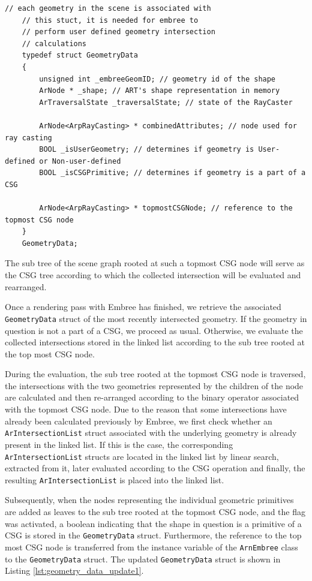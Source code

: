 \begin{listing} 
	\begin{lstlisting}[caption={Updated \texttt{GeometryData} struct for CSG rendering.}, label={lst:geometry_data_update1}]
	// each geometry in the scene is associated with
	// this stuct, it is needed for embree to
	// perform user defined geometry intersection
	// calculations
	typedef struct GeometryData 
	{
		unsigned int _embreeGeomID; // geometry id of the shape
		ArNode * _shape; // ART's shape representation in memory
		ArTraversalState _traversalState; // state of the RayCaster
		
		ArNode<ArpRayCasting> * combinedAttributes; // node used for ray casting
		BOOL _isUserGeometry; // determines if geometry is User-defined or Non-user-defined
		BOOL _isCSGPrimitive; // determines if geometry is a part of a CSG
		
		ArNode<ArpRayCasting> * topmostCSGNode; // reference to the topmost CSG node 
	}
	GeometryData;
	\end{lstlisting}
\end{listing}

The sub tree of the scene graph rooted at such a topmost CSG node will serve as the CSG tree according to which the collected intersection will be evaluated and rearranged.


Once a rendering pass with Embree has finished, we retrieve the associated \texttt{GeometryData} struct of the most recently intersected geometry. If the geometry in question is not a part of a CSG, we proceed as usual. Otherwise, we evaluate the collected intersections stored in the linked list according to the sub tree rooted at the top most CSG node. 

During the evaluation, the sub tree rooted at the topmost CSG node is traversed, the intersections with the two geometries represented by the children of the node are calculated and then re-arranged according to the binary operator associated with the topmost CSG node. Due to the reason that some intersections have already been calculated previously by Embree, we first check whether an \texttt{ArIntersectionList} struct associated with the underlying geometry is already present in the linked list. If this is the case, the corresponding \texttt{ArIntersectionList} structs are located in the linked list by linear search, extracted from it, later evaluated according to the CSG operation and finally, the resulting \texttt{ArIntersectionList} is placed into the linked list.


Subsequently, when the nodes representing the individual geometric primitives are added as leaves to the sub tree rooted at the topmost CSG node, and the flag was activated, a boolean indicating that the shape in question is a primitive of a CSG is stored in the \texttt{GeometryData} struct. Furthermore, the reference to the top most CSG node is transferred from the instance variable of the \texttt{ArnEmbree} class to the \texttt{GeometryData} struct. The updated \texttt{GeometryData} struct is shown in Listing \ref{lst:geometry_data_update1}.


